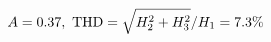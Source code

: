 \documentclass[preview]{standalone}
\begin{document}
\begin{align*}
\special{dvisvgm:raw <g id='unique000'>}A=0.37,\ \text{THD}=\sqrt{H_2^2+H_3^2}/H_1=7.3\%\special{dvisvgm:raw </g>}
\end{align*}
\end{document}
